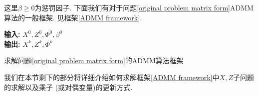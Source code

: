这里$\beta\ge0$为惩罚因子. 下面我们有对于问题\eqref{original problem matrix form}ADMM算法的一般框架. 见框架\ref{ADMM framework}.
\begin{algorithm}[htbp]
\textbf{输入: }$X^0,Z^0,\Phi^0,\beta^0$\\
\textbf{输出: }$X^k,Z^k,\Phi^k$
\caption{求解问题\eqref{original problem matrix form}的ADMM算法框架}
\label{ADMM framework}
\begin{algorithmic}[1]
	\ENDWHILE
\end{algorithmic}

\end{algorithm}
我们在本节剩下的部分将详细介绍如何求解框架\ref{ADMM framework}中$X,Z$子问题的求解以及乘子 (或对偶变量)的更新方式.

